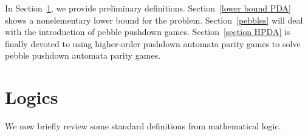 In Section~\ref{logics}, we provide preliminary definitions. 
Section~\ref{lower bound PDA} shows a nonelementary lower bound for the problem.
Section~\ref{pebbles} will deal with the introduction of pebble pushdown games.
Section~\ref{section HPDA} is finally devoted to using higher-order pushdown automata parity games
to solve pebble pushdown automata parity games.




\section{Logics}\label{logics}

We now brieﬂy review some standard deﬁnitions from mathematical logic.


\newcommand{\relational}{E}

